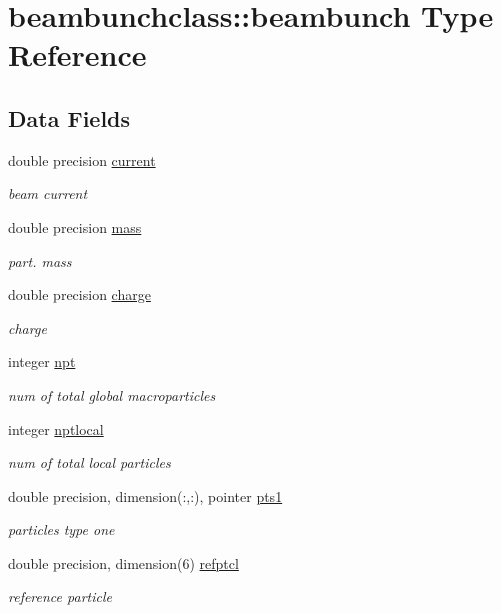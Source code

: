 \hypertarget{structbeambunchclass_1_1beambunch}{}\section{beambunchclass\+::beambunch Type Reference}
\label{structbeambunchclass_1_1beambunch}
\subsection*{Data Fields}
\begin{DoxyCompactItemize}
\item 
double precision \mbox{\hyperlink{structbeambunchclass_1_1beambunch_a0611d8fb67f60eb1ea7a3df79c5de915}{current}}
\begin{DoxyCompactList}\small\item\em beam current \end{DoxyCompactList}\item 
double precision \mbox{\hyperlink{structbeambunchclass_1_1beambunch_abeaad3b1ce823a9c49cab5a8b96f5ff0}{mass}}
\begin{DoxyCompactList}\small\item\em part. mass \end{DoxyCompactList}\item 
double precision \mbox{\hyperlink{structbeambunchclass_1_1beambunch_a555bb0dc53871a3f69755125598c8938}{charge}}
\begin{DoxyCompactList}\small\item\em charge \end{DoxyCompactList}\item 
integer \mbox{\hyperlink{structbeambunchclass_1_1beambunch_a20f5303645e1b7fa0cbfa88f81cda947}{npt}}
\begin{DoxyCompactList}\small\item\em num of total global macroparticles \end{DoxyCompactList}\item 
integer \mbox{\hyperlink{structbeambunchclass_1_1beambunch_a71a8687235fdc19d862fb13092b714a3}{nptlocal}}
\begin{DoxyCompactList}\small\item\em num of total local particles \end{DoxyCompactList}\item 
double precision, dimension(\+:,\+:), pointer \mbox{\hyperlink{structbeambunchclass_1_1beambunch_af0d19c1e3e537ade010af8554783c8d7}{pts1}}
\begin{DoxyCompactList}\small\item\em particles type one \end{DoxyCompactList}\item 
double precision, dimension(6) \mbox{\hyperlink{structbeambunchclass_1_1beambunch_a973e0e4ee1b24185bac1d727d2c074f5}{refptcl}}
\begin{DoxyCompactList}\small\item\em reference particle \end{DoxyCompactList}\end{DoxyCompactItemize}


